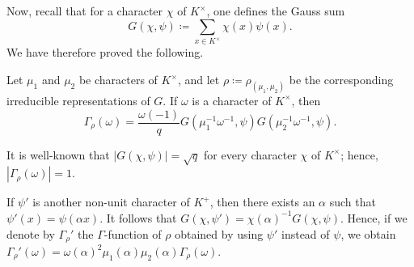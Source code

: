 \documentclass[../main.tex]{subfiles}
\begin{document}
Now, recall that for a character $\chi$ of $K^\times$, one defines the Gauss sum
\[G(\chi,\psi)\coloneqq\sum_{x\in K^\times}\chi(x)\psi(x).\]
We have therefore proved the following.
\begin{theorem} \label{thm:gamma-of-non-cusp}
	Let $\mu_1$ and $\mu_2$ be characters of $K^\times$, and let $\rho\coloneqq\rho_{(\mu_1,\mu_2)}$ be the corresponding irreducible representations of $G$. If $\omega$ is a character of $K^\times$, then
	\[\Gamma_\rho(\omega)=\frac{\omega(-1)}qG\left(\mu_1^{-1}\omega^{-1},\psi\right)G\left(\mu_2^{-1}\omega^{-1},\psi\right).\]
\end{theorem}
\begin{remark}
	It is well-known that $\left|G(\chi,\psi)\right|=\sqrt q$ for every character $\chi$ of $K^\times$; hence, $\left|\Gamma_\rho(\omega)\right|=1$.
\end{remark}
\begin{remark}
	If $\psi'$ is another non-unit character of $K^+$, then there exists an $\alpha$ such that $\psi'(x)=\psi(\alpha x)$. It follows that $G(\chi,\psi')=\chi(\alpha)^{-1}G(\chi,\psi)$. Hence, if we denote by $\Gamma_\rho'$ the $\Gamma$-function of $\rho$ obtained by using $\psi'$ instead of $\psi$, we obtain $\Gamma_\rho'(\omega)=\omega(\alpha)^2\mu_1(\alpha)\mu_2(\alpha)\Gamma_\rho(\omega)$.
\end{remark}
\end{document}
